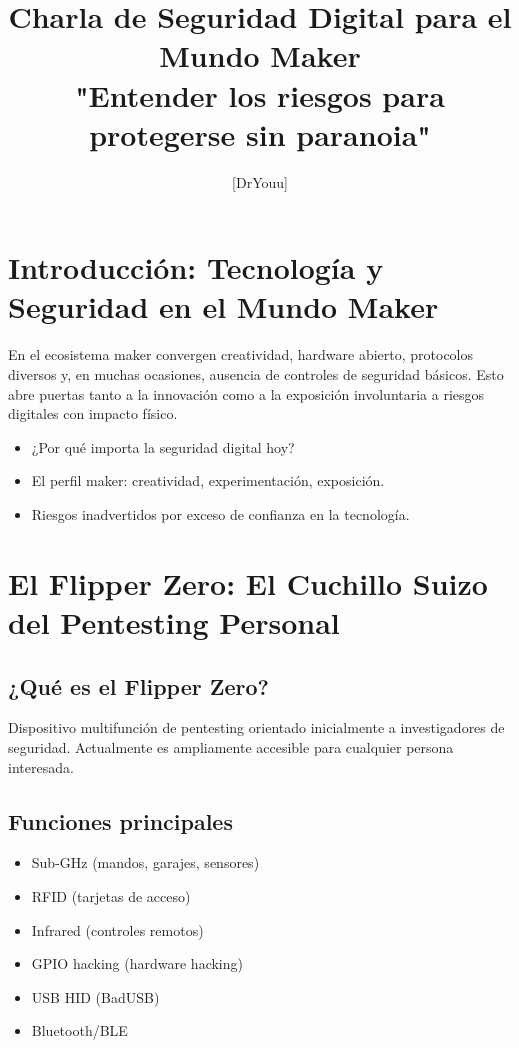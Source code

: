 \documentclass[a4paper,12pt]{article}
\title{\textbf{Charla de Seguridad Digital para el Mundo Maker\\ \large "Entender los riesgos para protegerse sin paranoia"}}
\author{[DrYouu]}
\date{}
\begin{document}
\maketitle

\tableofcontents
\newpage

\section{Introducción: Tecnología y Seguridad en el Mundo Maker}

En el ecosistema maker convergen creatividad, hardware abierto, protocolos diversos y, en muchas ocasiones, ausencia de controles de seguridad básicos. Esto abre puertas tanto a la innovación como a la exposición involuntaria a riesgos digitales con impacto físico.

\begin{itemize}
    \item ¿Por qué importa la seguridad digital hoy?
    \item El perfil maker: creatividad, experimentación, exposición.
    \item Riesgos inadvertidos por exceso de confianza en la tecnología.
\end{itemize}

\section{El Flipper Zero: El Cuchillo Suizo del Pentesting Personal}

\subsection{¿Qué es el Flipper Zero?}
Dispositivo multifunción de pentesting orientado inicialmente a investigadores de seguridad. Actualmente es ampliamente accesible para cualquier persona interesada.

\subsection{Funciones principales}
\begin{itemize}
    \item Sub-GHz (mandos, garajes, sensores)
    \item RFID (tarjetas de acceso)
    \item Infrared (controles remotos)
    \item GPIO hacking (hardware hacking)
    \item USB HID (BadUSB)
    \item Bluetooth/BLE
\end{itemize}
\end{document}
